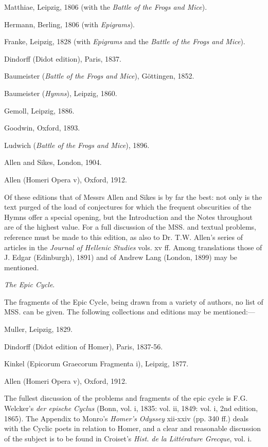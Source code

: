 Matthiae, Leipzig, 1806 (with the \emph{Battle of the Frogs and Mice}).

Hermann, Berling, 1806 (with \emph{Epigrams}).

Franke, Leipzig, 1828 (with \emph{Epigrams} and the \emph{Battle of the
Frogs and Mice}).

Dindorff (Didot edition), Paris, 1837.

Baumeister (\emph{Battle of the Frogs and Mice}), Göttingen, 1852.

Baumeister (\emph{Hymns}), Leipzig, 1860.

Gemoll, Leipzig, 1886.

Goodwin, Oxford, 1893.

Ludwich (\emph{Battle of the Frogs and Mice}), 1896.

Allen and Sikes, London, 1904.

Allen (Homeri Opera v), Oxford, 1912.

Of these editions that of Messrs Allen and Sikes is by far the best: not only
is the text purged of the load of conjectures for which the frequent
obscurities of the Hymns offer a special opening, but the Introduction and the
Notes throughout are of the highest value. For a full discussion of the MSS.
and textual problems, reference must be made to this edition, as also to Dr.
T.W. Allen’s series of articles in the \emph{Journal of Hellenic Studies}
vols. xv ff. Among translations those of J. Edgar (Edinburgh), 1891) and of
Andrew Lang (London, 1899) may be mentioned.

\emph{The Epic Cycle}.

The fragments of the Epic Cycle, being drawn from a variety of authors, no list
of MSS. can be given. The following collections and editions may be
mentioned:—

Muller, Leipzig, 1829.

Dindorff (Didot edition of Homer), Paris, 1837-56.

Kinkel (Epicorum Graecorum Fragmenta i), Leipzig, 1877.

Allen (Homeri Opera v), Oxford, 1912.

The fullest discussion of the problems and fragments of the epic cycle is F.G.
Welcker’s \emph{der epische Cyclus} (Bonn, vol. i, 1835: vol. ii, 1849:
vol. i, 2nd edition, 1865). The Appendix to Monro’s \emph{Homer’s
Odyssey} xii-xxiv (pp. 340 ff.) deals with the Cyclic poets in relation to
Homer, and a clear and reasonable discussion of the subject is to be found in
Croiset’s \emph{Hist. de la Littérature Grecque}, vol. i.

